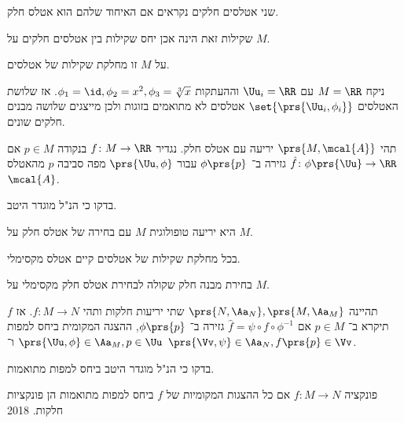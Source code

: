 \documentclass[a4paper,10pt,twoside,openany]{book}
\begin{document}
\begin{definition}
שני אטלסים חלקים נקראים
אם האיחוד שלהם הוא אטלס חלק.
\end{definition}
\begin{exercise}
שקילות זאת הינה אכן יחס שקילות בין אטלסים חלקים על
$M$.
\end{exercise}
\begin{definition}
על
$M$
זו מחלקת שקילות של אטלסים.
\end{definition}
\begin{example}
ניקח
$M = \RR$
עם
$\Uu_i = \RR$
וההעתקות
$\phi_1 = \id, \phi_2 = x^2, \phi_3 = \sqrt[3]{x}$.
אז שלושת האטלסים
$\set{\prs{\Uu_i, \phi_i}}$
אטלסים לא מתואמים בזוגות ולכן מייצגים שלושה מבנים חלקים שונים.
\end{example}
\begin{definition}
תהי
$\prs{M,\mcal{A}}$
יריעה עם אטלס חלק.
נגדיר
$f \colon M \to \RR$
בנקודה
$p \in M$
אם
$\hat{f} \colon \phi\prs{\Uu} \to \RR$
גזירה ב־%
$\phi\prs{p}$
עבור
$\prs{\Uu, \phi}$
מפה סביבה
$p$
מהאטלס
$\mcal{A}$.
\end{definition}
\begin{exercise}
בדקו כי הנ"ל מוגדר היטב.
\end{exercise}
\begin{definition}
היא יריעה טופולוגית
$M$
עם בחירה של אטלס חלק על
$M$.
\end{definition}
\begin{claim}
בכל מחלקת שקילות של אטלסים קיים אטלס מקסימלי.
\end{claim}
\begin{corollary}
בחירת מבנה חלק שקולה לבחירת אטלס חלק מקסימלי על
$M$.
\end{corollary}
\begin{definition}
תהיינה
$\prs{N, \Aa_N}, \prs{M, \Aa_M}$
שתי יריעות חלקות ותהי
$f \colon M \to N$.
אז
$f$
תיקרא
ב־%
$p \in M$
אם
$\hat{f} = \psi \circ f \circ \phi^{-1}$
גזירה ב־%
$\phi\prs{p}$,
ההצגה המקומית ביחס למפות
$\prs{\Uu, \phi} \in \Aa_M, p \in \Uu$
ו־%
$\prs{\Vv, \psi} \in \Aa_N, f\prs{p} \in \Vv$.
\end{definition}
\begin{exercise}
בדקו כי הנ"ל מוגדר היטב ביחס למפות מתואמות.
\end{exercise}
\begin{definition}
פונקציה
$f \colon M \to N$
אם כל ההצגות המקומיות של
$f$
ביחס למפות מתואמות הן פונקציות חלקות.%
%
{2018}
\end{definition}
\end{document}
